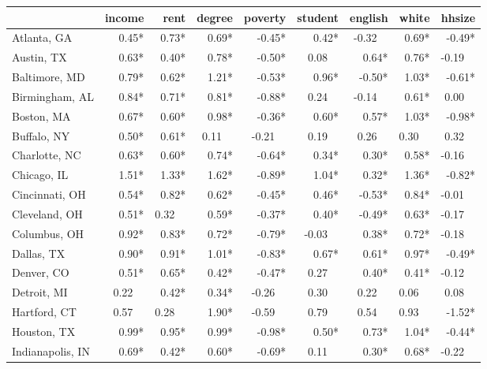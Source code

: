 \fontsize{9}{10}\selectfont
\begin{tabular}{lrrrrrrrr}
	
	\toprule
	{}                 & income &    rent &  degree & poverty & student & english &   white &  hhsize \\ \midrule
	Atlanta, GA        &  0.45* &   0.73* &   0.69* &  -0.45* &   0.42* & -0.32~~ &   0.69* &  -0.49* \\
	Austin, TX         &  0.63* &   0.40* &   0.78* &  -0.50* &  0.08~~ &   0.64* &   0.76* & -0.19~~ \\
	Baltimore, MD      &  0.79* &   0.62* &   1.21* &  -0.53* &   0.96* &  -0.50* &   1.03* &  -0.61* \\
	Birmingham, AL     &  0.84* &   0.71* &   0.81* &  -0.88* &  0.24~~ & -0.14~~ &   0.61* &  0.00~~ \\
	Boston, MA         &  0.67* &   0.60* &   0.98* &  -0.36* &   0.60* &   0.57* &   1.03* &  -0.98* \\
	Buffalo, NY        &  0.50* &   0.61* &  0.11~~ & -0.21~~ &  0.19~~ &  0.26~~ &  0.30~~ &  0.32~~ \\
	Charlotte, NC      &  0.63* &   0.60* &   0.74* &  -0.64* &   0.34* &   0.30* &   0.58* & -0.16~~ \\
	Chicago, IL        &  1.51* &   1.33* &   1.62* &  -0.89* &   1.04* &   0.32* &   1.36* &  -0.82* \\
	Cincinnati, OH     &  0.54* &   0.82* &   0.62* &  -0.45* &   0.46* &  -0.53* &   0.84* & -0.01~~ \\
	Cleveland, OH      &  0.51* &  0.32~~ &   0.59* &  -0.37* &   0.40* &  -0.49* &   0.63* & -0.17~~ \\
	Columbus, OH       &  0.92* &   0.83* &   0.72* &  -0.79* & -0.03~~ &   0.38* &   0.72* & -0.18~~ \\
	Dallas, TX         &  0.90* &   0.91* &   1.01* &  -0.83* &   0.67* &   0.61* &   0.97* &  -0.49* \\
	Denver, CO         &  0.51* &   0.65* &   0.42* &  -0.47* &  0.27~~ &   0.40* &   0.41* & -0.12~~ \\
	Detroit, MI        & 0.22~~ &   0.42* &   0.34* & -0.26~~ &  0.30~~ &  0.22~~ &  0.06~~ &  0.08~~ \\
	Hartford, CT       & 0.57~~ &  0.28~~ &   1.90* & -0.59~~ &  0.79~~ &  0.54~~ &  0.93~~ &  -1.52* \\
	Houston, TX        &  0.99* &   0.95* &   0.99* &  -0.98* &   0.50* &   0.73* &   1.04* &  -0.44* \\
	Indianapolis, IN   &  0.69* &   0.42* &   0.60* &  -0.69* &  0.11~~ &   0.30* &   0.68* & -0.22~~ \\

\end{tabular}

